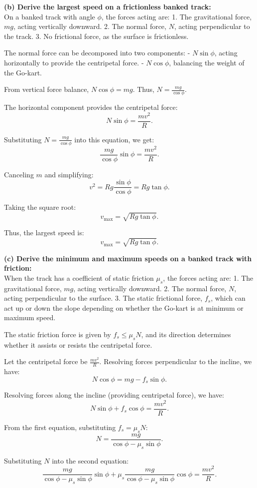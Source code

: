 \textbf{(b) Derive the largest speed on a frictionless banked track:} \\[1em]
On a banked track with angle $\phi$, the forces acting are:
1. The gravitational force, $mg$, acting vertically downward.
2. The normal force, $N$, acting perpendicular to the track.
3. No frictional force, as the surface is frictionless.

The normal force can be decomposed into two components:
- $N\sin\phi$, acting horizontally to provide the centripetal force.
- $N\cos\phi$, balancing the weight of the Go-kart.

From vertical force balance, $N\cos\phi = mg$. Thus, $N = \frac{mg}{\cos\phi}$.

The horizontal component provides the centripetal force:
\[
N\sin\phi = \frac{mv^2}{R}.
\]

Substituting $N = \frac{mg}{\cos\phi}$ into this equation, we get:
\[
\frac{mg}{\cos\phi} \sin\phi = \frac{mv^2}{R}.
\]

Canceling $m$ and simplifying:
\[
v^2 = Rg \frac{\sin\phi}{\cos\phi} = Rg \tan\phi.
\]

Taking the square root:
\[
v_{\text{max}} = \sqrt{Rg \tan\phi}.
\]

Thus, the largest speed is:
\[
\boxed{v_{\text{max}} = \sqrt{Rg \tan\phi}}.
\]

\textbf{(c) Derive the minimum and maximum speeds on a banked track with friction:} \\[1em]
When the track has a coefficient of static friction $\mu_s$, the forces acting are:
1. The gravitational force, $mg$, acting vertically downward.
2. The normal force, $N$, acting perpendicular to the surface.
3. The static frictional force, $f_s$, which can act up or down the slope depending on whether the Go-kart is at minimum or maximum speed.

The static friction force is given by $f_s \leq \mu_s N$, and its direction determines whether it assists or resists the centripetal force.

Let the centripetal force be $\frac{mv^2}{R}$. Resolving forces perpendicular to the incline, we have:
\[
N\cos\phi = mg - f_s\sin\phi.
\]

Resolving forces along the incline (providing centripetal force), we have:
\[
N\sin\phi + f_s\cos\phi = \frac{mv^2}{R}.
\]

From the first equation, substituting $f_s = \mu_s N$:
\[
N = \frac{mg}{\cos\phi - \mu_s \sin\phi}.
\]

Substituting $N$ into the second equation:
\[
\frac{mg}{\cos\phi - \mu_s \sin\phi} \sin\phi + \mu_s \frac{mg}{\cos\phi - \mu_s \sin\phi} \cos\phi = \frac{mv^2}{R}.
\]

